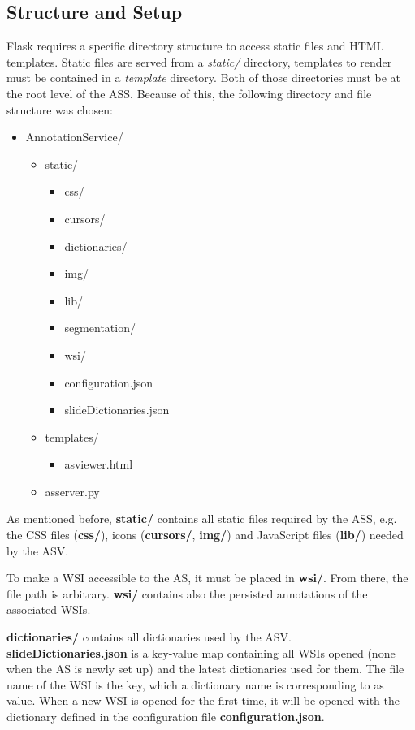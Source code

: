 \subsection{Structure and Setup}
\label{sec4_setup}
Flask requires a specific directory structure to access static files and HTML templates. Static files are served from a \emph{static/} directory, templates to render must be contained in a \emph{template} directory. Both of those directories must be at the root level of the ASS\cite{web:flask}. Because of this, the following directory and file structure was chosen:\clearpage
\begin{itemize}
	\item AnnotationService/
	\begin{itemize}
		\item static/
		\begin{itemize}
			\item css/
			\item cursors/
			\item dictionaries/
			\item img/
			\item lib/
			\item segmentation/
			\item wsi/
			\item configuration.json
			\item slideDictionaries.json
		\end{itemize}
		\item templates/
		\begin{itemize}
			\item as{\textunderscore}viewer.html
		\end{itemize}
		\item as{\textunderscore}server.py
	\end{itemize}
\end{itemize}

As mentioned before, \textbf{static/} contains all static files required by the ASS, e.g. the CSS files (\textbf{css/}), icons (\textbf{cursors/}, \textbf{img/}) and JavaScript files (\textbf{lib/}) needed by the ASV.

To make a WSI accessible to the AS, it must be placed in \textbf{wsi/}. From there, the file path is arbitrary. \textbf{wsi/} contains also the persisted annotations of the associated WSIs.

\textbf{dictionaries/} contains all dictionaries used by the ASV. \textbf{slideDictionaries.json} is a key-value map containing all WSIs opened (none when the AS is newly set up) and the latest dictionaries used for them. The file name of the WSI is the key, which a dictionary name is corresponding to as value. When a new WSI is opened for the first time, it will be opened with the dictionary defined in the configuration file \textbf{configuration.json}.

